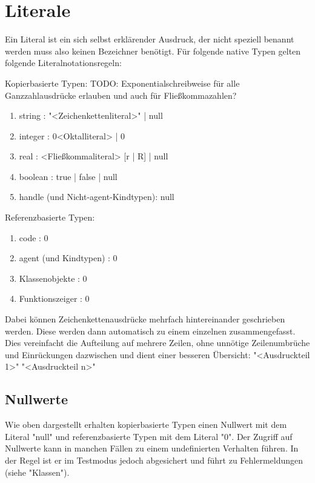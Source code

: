 \chapter{Literale}
Ein Literal ist ein sich selbst erklärender Ausdruck, der nicht speziell benannt werden muss also keinen Bezeichner benötigt.
Für folgende native Typen gelten folgende Literalnotationsregeln:

Kopierbasierte Typen:
TODO: Exponentialschreibweise für alle Ganzzahlausdrücke erlauben und auch für Fließkommazahlen?
\begin{enumerate}
\item string : "<Zeichenkettenliteral>" | null
\item integer : 0<Oktalliteral> | 0%
\item real : <Fließkommaliteral> [r | R] | null
\item boolean : true | false | null
\item handle (und Nicht-agent-Kindtypen): null
\end{enumerate}

Referenzbasierte Typen:
\begin{enumerate}
\item code : 0
\item agent (und Kindtypen) : 0
\item Klassenobjekte : 0
\item Funktionszeiger : 0
\end{enumerate}

Dabei können Zeichenkettenausdrücke mehrfach hintereinander geschrieben werden. Diese werden dann automatisch zu einem einzelnen
zusammengefasst. Dies vereinfacht die Aufteilung auf mehrere Zeilen, ohne unnötige Zeilenumbrüche und Einrückungen dazwischen und
dient einer besseren Übersicht:
"<Ausdruckteil 1>"
"<Ausdruckteil n>"

\section{Nullwerte}
Wie oben dargestellt erhalten kopierbasierte Typen einen Nullwert mit dem Literal "null" und referenzbasierte Typen mit dem Literal "0".
Der Zugriff auf Nullwerte kann in manchen Fällen zu einem undefinierten Verhalten führen.
In der Regel ist er im Testmodus jedoch abgesichert und führt zu Fehlermeldungen (siehe "Klassen").

